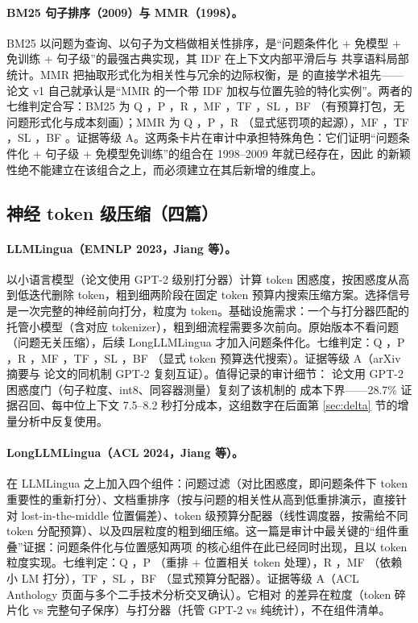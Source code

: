 \paragraph{BM25 句子排序（2009）与 MMR（1998）。}
BM25 以问题为查询、以句子为文档做相关性排序，是``问题条件化 + 免模型 + 免训练 + 句子级''的最强古典实现，其 IDF 在上下文内部平滑后与 \sieve{} 共享语料局部统计。MMR 把抽取形式化为相关性与冗余的边际权衡，是 \sieve{} 的直接学术祖先——\sieve{} 论文 v1 自己就承认是``MMR 的一个带 IDF 加权与位置先验的特化实例''。两者的七维判定合写：BM25 为 Q \ck{}，P \no{}，R \no{}，MF \ck{}，TF \ck{}，SL \ck{}，BF \partl{}（有预算打包，无问题形式化与成本刻画）；MMR 为 Q \ck{}，P \no{}，R \ck{}（显式惩罚项的起源），MF \ck{}，TF \ck{}，SL \ck{}，BF \no{}。证据等级 A。这两条卡片在审计中承担特殊角色：它们证明``问题条件化 + 句子级 + 免模型免训练''的组合在 1998--2009 年就已经存在，因此 \sieve{} 的新颖性绝不能建立在该组合之上，而必须建立在其后新增的维度上。

\subsection{神经 token 级压缩（四篇）}

\paragraph{LLMLingua（EMNLP 2023，Jiang 等）。}
以小语言模型（论文使用 GPT-2 级别打分器）计算 token 困惑度，按困惑度从高到低迭代删除 token，粗到细两阶段在固定 token 预算内搜索压缩方案。选择信号是一次完整的神经前向打分，粒度为 token。基础设施需求：一个与打分器匹配的托管小模型（含对应 tokenizer），粗到细流程需要多次前向。原始版本不看问题（问题无关压缩），后续 LongLLMLingua 才加入问题条件化。七维判定：Q \no{}，P \no{}，R \no{}，MF \no{}，TF \ck{}，SL \no{}，BF \ck{}（显式 token 预算迭代搜索）。证据等级 A（arXiv 摘要与 \sieve{} 论文的同机制 GPT-2 复刻互证）。值得记录的审计细节：\sieve{} 论文用 GPT-2 困惑度门（句子粒度、int8、同容器测量）复刻了该机制的 成本下界——28.7\% 证据召回、每中位上下文 7.5--8.2 秒打分成本，这组数字在后面第 \ref{sec:delta} 节的增量分析中反复使用。

\paragraph{LongLLMLingua（ACL 2024，Jiang 等）。}
在 LLMLingua 之上加入四个组件：问题过滤（对比困惑度，即问题条件下 token 重要性的重新打分）、文档重排序（按与问题的相关性从高到低重排演示，直接针对 lost-in-the-middle 位置偏差）、token 级预算分配器（线性调度器，按需给不同 token 分配预算）、以及四层粒度的粗到细压缩。这一篇是审计中最关键的``组件重叠''证据：问题条件化与位置感知两项 \sieve{} 的核心组件在此已经同时出现，且以 token 粒度实现。七维判定：Q \ck{}，P \ck{}（重排 + 位置相关 token 处理），R \no{}，MF \no{}（依赖小 LM 打分），TF \ck{}，SL \no{}，BF \ck{}（显式预算分配器）。证据等级 A（ACL Anthology 页面与多个二手技术分析交叉确认）。它相对 \sieve{} 的差异在粒度（token 碎片化 vs 完整句子保序）与打分器（托管 GPT-2 vs 纯统计），不在组件清单。

